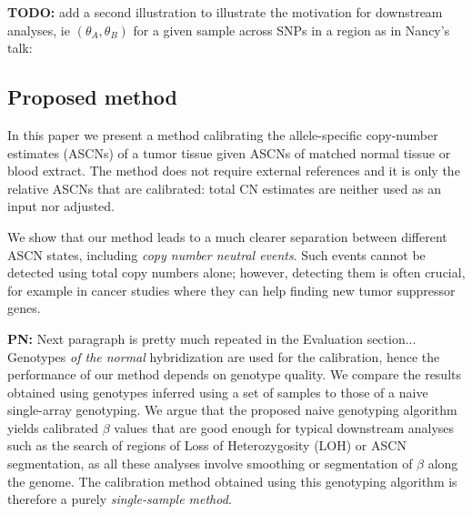 \documentclass[10pt]{bmc_article}
\newenvironment{bmcformat}{\fussy\setboolean{publ}{true}}{\fussy}
\newenvironment{TODO}{\color{red}\textbf{TODO:}}{}
\newenvironment{PN}{\color{blue}\textbf{PN:}}{}
\begin{document}
\begin{bmcformat}
\begin{TODO}
  add a second illustration to illustrate the motivation for downstream analyses, ie  $(\theta_A,\theta_B)$ for a given sample across SNPs in a region as in Nancy's talk:
\end{TODO}

\subsection*{Proposed method}

In this paper we present a method calibrating the allele-specific copy-number estimates (ASCNs) of a tumor tissue given ASCNs of matched normal tissue or blood extract.  The method does not require external references and it is only the relative ASCNs that are calibrated: total CN estimates are neither used as an input nor adjusted.

We show that our method leads to a much clearer separation between different ASCN states, including \emph{copy number neutral events}. Such events cannot be detected using total copy numbers alone; however, detecting them is often crucial, for example in cancer studies where they can help finding new tumor suppressor genes.

\begin{PN}
  Next paragraph is pretty much repeated in the Evaluation section...
\end{PN}
Genotypes \emph{of the normal} hybridization are used for the calibration, hence the performance of our method depends on genotype quality. We compare the results obtained using genotypes inferred using a set of samples to those of a naive single-array genotyping. We argue that the proposed naive genotyping algorithm yields calibrated $\beta$ values that are good enough for typical downstream analyses such as the search of regions of Loss of Heterozygosity (LOH) or ASCN segmentation, as all these analyses  involve smoothing or segmentation of $\beta$ along the genome. The calibration method obtained using this genotyping algorithm is therefore a purely \emph{single-sample method}.



\end{bmcformat}
\end{document}
